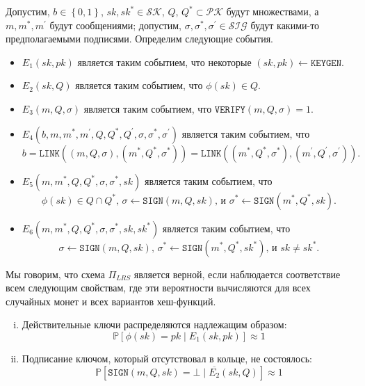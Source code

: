 \documentclass{llncs}
\newcommand{\prob}{\mathbb{P}}
\begin{document}
\begin{definition}\label{def:lrs-correct}
Допустим, $b\in \left\{0,1\right\}$, $sk, sk^* \in \mathcal{SK}$, $Q$, $Q^* \subset \mathcal{PK}$ будут множествами, а $m, m^*, m^\prime$ будут сообщениями; допустим, $\sigma, \sigma^*, \sigma^\prime \in \mathcal{SIG}$ будут какими-то предполагаемыми подписями. Определим следующие события.
\begin{itemize}
\item $E_1(sk, pk)$ является таким событием, что некоторые $(sk, pk) \leftarrow \texttt{KEYGEN}$.

\item $E_2(sk, Q)$ является таким событием, что $\phi(sk) \in Q$.

\item $E_3(m, Q, \sigma)$ является таким событием, что $\texttt{VERIFY}(m, Q, \sigma) = 1$.

\item $E_4(b, m, m^*, m^\prime, Q, Q^*, Q^\prime, \sigma, \sigma^*, \sigma^\prime)$ является таким событием, что \[b = \texttt{LINK}((m, Q, \sigma), (m^*, Q^*, \sigma^*)) = \texttt{LINK}((m^*, Q^*, \sigma^*), (m^\prime, Q^\prime, \sigma^\prime)).\]

\item $E_5(m, m^*, Q, Q^*, \sigma, \sigma^*, sk)$ является таким событием, что \[\phi(sk) \in Q \cap Q^*\text{, }\sigma \leftarrow \texttt{SIGN}(m, Q, sk)\text{, и }\sigma^* \leftarrow \texttt{SIGN}(m^*, Q^*, sk).\]

\item $E_6(m, m^*, Q, Q^*, \sigma, \sigma^*, sk, sk^*)$ является таким событием, что  \[\sigma \leftarrow \texttt{SIGN}(m, Q, sk)\text{, }\sigma^* \leftarrow \texttt{SIGN}(m^*, Q^*, sk^*)\text{, и }sk \neq sk^*.\]
\end{itemize}
Мы говорим, что схема $\Pi_{LRS}$ является верной, если наблюдается соответствие всем следующим свойствам, где эти вероятности вычисляются для всех случайных монет и всех вариантов хеш-функций.

\begin{enumerate}[(i)]
\item Действительные ключи распределяются надлежащим образом: $$\prob\left[ \phi(sk) = pk \mid E_1(sk, pk) \right] \approx 1$$

\item Подписание ключом, который отсутствовал в кольце, не состоялось: $$\prob\left[ \texttt{SIGN}(m, Q, sk) = \bot \mid \overline{E_2}(sk, Q)  \right] \approx 1$$


\end{enumerate}
\end{definition}
\end{document}
